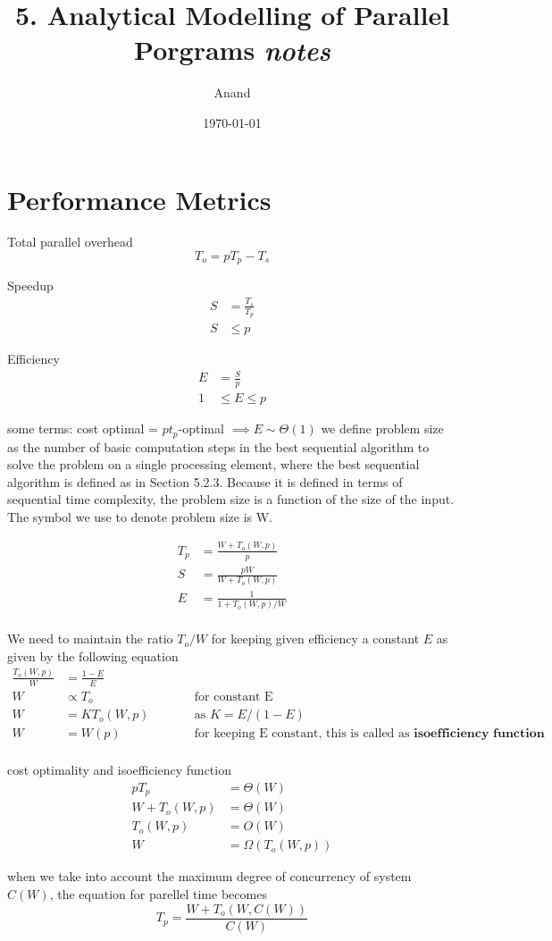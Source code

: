 \documentclass[11pt]{article}
\title{5. Analytical Modelling of Parallel Porgrams \textit{notes}}
\author{Anand}
\date{\today}
\begin{document}
\maketitle

\section{Performance Metrics}

Total parallel overhead
$$
T_o = pT_p-T_s
$$

Speedup
\begin{align*}
S&=\frac{T_s}{T_p} \\
S &\le p
\end{align*}

Efficiency
\begin{align*}
  E&=\frac{S}{p} \\
  1&\le E\le p
\end{align*}

some terms: cost optimal = $pt_p$-optimal $\implies E\sim\Theta(1)$ 
\break
we define problem size as the
number of basic computation steps in the best sequential algorithm to solve the problem on a
single processing element, where the best sequential algorithm is defined as in Section 5.2.3.
Because it is defined in terms of sequential time complexity, the problem size is a function of
the size of the input. The symbol we use to denote problem size is W.

\begin{align*}
  T_p&=\frac{W+T_o(W,p)}{p} \\
  S &= \frac{pW}{W+T_o(W,p)} \\
  E &= \frac{1}{1+T_o(W,p)/W} \\
\end{align*}

We need to maintain the ratio $T_o/W$ for keeping given efficiency a constant $E$ as given by the following equation
\begin{align*}
  \frac{T_o(W,p)}{W} &= \frac{1-E}{E} \\
  W &\propto T_o\qquad&&\text{for constant E} \\ 
  W &= KT_o(W,p)\qquad&&\text{as } K=E/(1-E)\\ 
  W &= W(p)\qquad&&\text{for keeping E constant, this is called as }\textbf{isoefficiency function}\\ 
\end{align*}

cost optimality and isoefficiency function
\begin{align*}
  pT_p&=\Theta(W) \\
  W + T_o(W,p) &= \Theta(W) \\
  T_o(W,p) &=O(W) \\
  W &= \Omega(T_o(W,p))
\end{align*}

when we take into account the maximum degree of concurrency of system $C(W)$, the equation for parellel time becomes 
$$
T_p=\frac{W+T_o(W,C(W))}{C(W)}
$$
\end{document}
